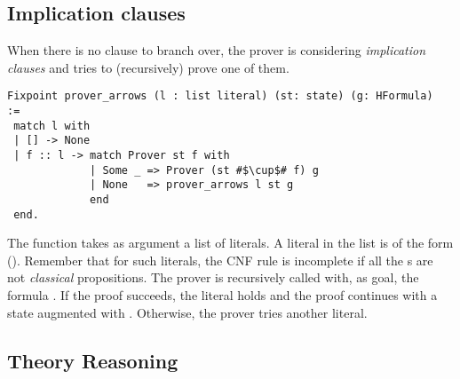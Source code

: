 \documentclass[utf8,a4paper,UKenglish,cleveref, autoref, thm-restate]{lipics-v2019}
\begin{document}
\subsection{Implication clauses}
When there is no clause to branch over, the prover is considering 
\emph{implication clauses} and tries to (recursively) prove one of
them.
\begin{verbatim}
Fixpoint prover_arrows (l : list literal) (st: state) (g: HFormula)  :=
 match l with
 | [] -> None
 | f :: l -> match Prover st f with
             | Some _ => Prover (st #$\cup$# f) g
             | None   => prover_arrows l st g
             end
 end.
\end{verbatim}
The function  takes as argument a list  of
literals.  A literal  in the list is of the form 
().
%
Remember that for such literals, the CNF rule  is incomplete if all the s are not \emph{classical} propositions.
%
The prover is recursively called with, as goal,
the formula . If the proof succeeds, the literal  holds
and the proof continues with a state augmented with .
Otherwise, the prover tries another literal.
%

\subsection{Theory Reasoning}
\label{sec:thy-reasoning}
\end{document}
